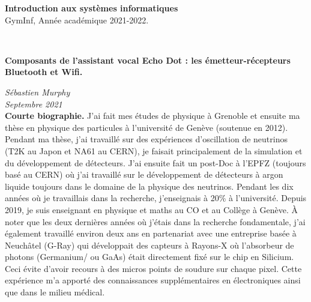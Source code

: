 \documentclass[12pt,svgnames]{article}
\begin{document}


\begin{large}\textcolor{airforceblue}{\textbf{Introduction aux systèmes informatiques} \\
GymInf,  Année académique 2021-2022.}
\end{large}\\
\begin{Large}
\begin{center}
   \textcolor{airforceblue}{\textbf{Composants de l'assistant vocal Echo Dot : les émetteur-récepteurs Bluetooth et Wifi.}}\\[.1cm]
\end{center}
\end{Large}
\textit{Sébastien Murphy}\\
\textit{Septembre 2021}
\\[.2cm]





\textbf{Courte biographie.} J'ai fait mes études de physique à Grenoble et ensuite ma thèse en physique des particules à l'université de Genève (soutenue en 2012). Pendant ma thèse, j'ai travaillé sur des expériences d'oscillation de neutrinos (T2K au Japon et NA61 au CERN), je faisait principalement de la simulation et du développement de détecteurs. J'ai ensuite fait un post-Doc à l'EPFZ (toujours basé au CERN) où j'ai travaillé sur le développement de détecteurs à argon liquide toujours dans le domaine de la physique des neutrinos. Pendant les dix années où je travaillais dans la recherche, j'enseignais à 20\% à l'université. Depuis 2019, je suis enseignant en physique et maths au CO et au Collège à Genève. À noter que les deux dernières années où j'étais dans la recherche fondamentale, j'ai également travaillé environ deux ans en partenariat avec une entreprise basée à Neuchâtel (G-Ray) qui développait des capteurs à Rayons-X où l'absorbeur de photons (Germanium/ ou GaAs) était directement fixé sur le chip en Silicium. Ceci évite d'avoir recours à des micros points de soudure sur chaque pixel. Cette expérience m'a apporté des connaissances supplémentaires en électroniques ainsi que dans le milieu médical.
\end{document}
